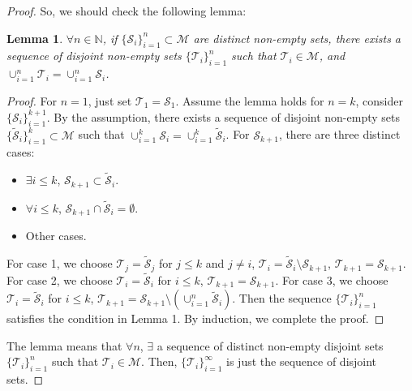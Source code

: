 \documentclass{article}
\newtheorem{lemma}{Lemma}
\begin{document}
\begin{proof}
    So, we should check the following lemma:
    \begin{lemma}
        $\forall n\in\mathbb{N}$, 
        if $\{\mathcal{S}_{i}\}_{i=1}^{n}\subset\mathcal{M}$ 
        are distinct non-empty sets,
        there exists a sequence of disjoint non-empty sets 
        $\{\mathcal{T}_{i}\}_{i=1}^{n}$ 
        such that $\mathcal{T}_{i}\in\mathcal{M}$, and 
        $\cup_{i=1}^{n}\mathcal{T}_{i}=\cup_{i=1}^{n}\mathcal{S}_{i}$.
    \end{lemma}
    \begin{proof}
        For $n=1$, 
        just set $\mathcal{T}_{1}=\mathcal{S}_{1}$.
        Assume the lemma holds for $n=k$, 
        consider $\{\mathcal{S}_{i}\}_{i=1}^{k+1}$. 
        By the assumption, 
        there exists a sequence of disjoint non-empty sets 
        $\{\tilde{\mathcal{S}}_{i}\}_{i=1}^{k}\subset\mathcal{M}$ 
        such that $\cup_{i=1}^{k}\mathcal{S}_{i}
        =\cup_{i=1}^{k}\tilde{\mathcal{S}}_{i}$. 
        For $\mathcal{S}_{k+1}$, there are three distinct cases:
        \begin{itemize}
            \item $\exists i\le k$, 
            $\mathcal{S}_{k+1}\subset\tilde{\mathcal{S}}_{i}$.
            \item $\forall i\le k$, 
            $\mathcal{S}_{k+1}\cap\tilde{\mathcal{S}}_{i}=\emptyset$.
            \item Other cases.
        \end{itemize}
        For case 1, we choose 
        $\mathcal{T}_{j}=\tilde{\mathcal{S}}_{j}$ 
        for $j\le k$ and $j\neq i$, 
        $\mathcal{T}_{i}=\tilde{\mathcal{S}}_{i}
        \setminus\mathcal{S}_{k+1}$, 
        $\mathcal{T}_{k+1}=\mathcal{S}_{k+1}$. 
        For case 2, we choose 
        $\mathcal{T}_{i}=\tilde{\mathcal{S}}_{i}$ for $i\le k$, 
        $\mathcal{T}_{k+1}=\mathcal{S}_{k+1}$. 
        For case 3, we choose 
        $\mathcal{T}_{i}=\tilde{\mathcal{S}}_{i}$ for $i\le k$, 
        $\mathcal{T}_{k+1}=\mathcal{S}_{k+1}\setminus
        \left(\cup_{i=1}^{n}\tilde{\mathcal{S}}_{i}\right)$.
        Then the sequence $\{\mathcal{T}_{i}\}_{i=1}^{n}$ 
        satisfies the condition in Lemma 1. 
        By induction, we complete the proof.\qedhere
    \end{proof}
    The lemma means that $\forall n$, 
    $\exists$ a sequence of distinct non-empty disjoint sets 
    $\{\mathcal{T}_{i}\}_{i=1}^{n}$ 
    such that $\mathcal{T}_{i}\in\mathcal{M}$. 
    Then, $\{\mathcal{T}_{i}\}_{i=1}^{\infty}$ is just 
    the sequence of disjoint sets.


\end{proof}
\end{document}
